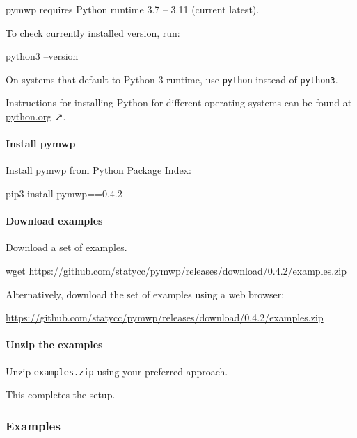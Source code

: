 pymwp requires Python runtime 3.7 -- 3.11 (current latest).

To check currently installed version, run:

\begin{console}[label={lst:python-version}]
python3 --version
\end{console}

On systems that default to Python 3 runtime, use \texttt{python} instead
of \texttt{python3}.

Instructions for installing Python for different operating systems can
be found at \href{https://python.org}{python.org} ↗.

\paragraph{Install pymwp}

Install pymwp from Python Package Index:

\begin{console}[label={lst:install-cmd}]
pip3 install pymwp==0.4.2
\end{console}

\paragraph{Download examples}

Download a set of examples.

\begin{console}[label={lst:get-examples}]
wget https://github.com/statycc/pymwp/releases/download/0.4.2/examples.zip
\end{console}

Alternatively, download the set of examples using a web browser:

\url{https://github.com/statycc/pymwp/releases/download/0.4.2/examples.zip}

\paragraph{Unzip the examples}

Unzip \texttt{examples.zip} using your preferred approach.

This completes the setup.


\subsubsection{Examples}\label{guide-examples}

